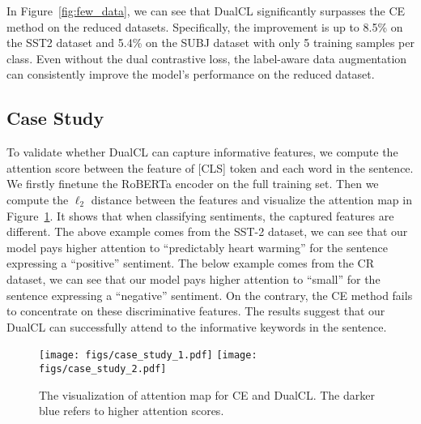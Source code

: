 In Figure~\ref{fig:few_data}, we can see that DualCL significantly surpasses the CE method on the reduced datasets. Specifically, the improvement is up to 8.5\% on the SST2 dataset and 5.4\% on the SUBJ dataset with only 5 training samples per class. Even without the dual contrastive loss, the label-aware data augmentation can consistently improve the model's performance on the reduced dataset.

\subsection{Case Study}

To validate whether DualCL can capture informative features, we compute the attention score between the feature of [CLS] token and each word in the sentence. We firstly finetune the RoBERTa encoder on the full training set. Then we compute the $\ell_2$ distance between the features and visualize the attention map in Figure~\ref{fig:case_study}. It shows that when classifying sentiments, the captured features are different. The above example comes from the SST-2 dataset, we can see that our model pays higher attention to  ``predictably heart warming'' for the sentence expressing a ``positive'' sentiment. The below example comes from the CR dataset, we can see that our model pays higher attention to ``small'' for the sentence expressing a ``negative'' sentiment. On the contrary, the CE method fails to concentrate on these discriminative features. The results suggest that our DualCL can successfully attend to the informative keywords in the sentence.

\begin{figure}[t]
    \centering
    \texttt{[image: figs/case\_study\_1.pdf]}
    \texttt{[image: figs/case\_study\_2.pdf]}
    \caption{The visualization of attention map for CE and DualCL. The darker blue refers to higher attention scores.}
    \label{fig:case_study}
\end{figure}
